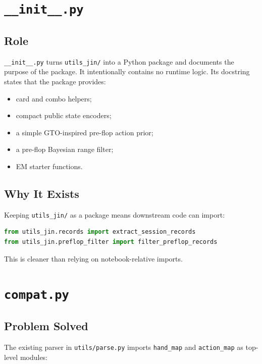 \documentclass[11pt]{article}
\begin{document}
\newpage
\section{\texttt{\_\_init\_\_.py}}

\subsection{Role}

\texttt{\_\_init\_\_.py} turns \texttt{utils\_jin/} into a Python package and
documents the purpose of the package. It intentionally contains no runtime
logic. Its docstring states that the package provides:

\begin{itemize}[leftmargin=*]
  \item card and combo helpers;
  \item compact public state encoders;
  \item a simple GTO-inspired pre-flop action prior;
  \item a pre-flop Bayesian range filter;
  \item EM starter functions.
\end{itemize}

\subsection{Why It Exists}

Keeping \texttt{utils\_jin/} as a package means downstream code can import:

\begin{lstlisting}[language=Python]
from utils_jin.records import extract_session_records
from utils_jin.preflop_filter import filter_preflop_records
\end{lstlisting}

This is cleaner than relying on notebook-relative imports.

\section{\texttt{compat.py}}

\subsection{Problem Solved}

The existing parser in \texttt{utils/parse.py} imports \texttt{hand\_map} and
\texttt{action\_map} as top-level modules:
\end{document}
